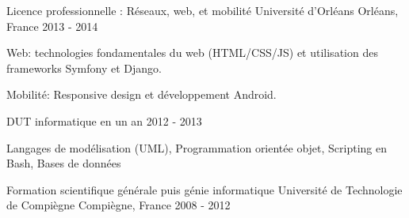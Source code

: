 \begin{cventries}
  \cventry
    {Licence professionnelle : Réseaux, web, et mobilité}
    {Université d'Orléans}
    {Orléans, France}
    {2013 - 2014}
    {
      \begin{cvitems}
        \item {Web: technologies fondamentales du web (HTML/CSS/JS) et utilisation des frameworks Symfony et Django.}
        \item {Mobilité: Responsive design et développement Android.}
      \end{cvitems}
      \vspace{-2.0mm}
    }
  \cventry
    {DUT informatique en un an}
    {}
    {}
    {2012 - 2013}
    {
      \begin{cvitems}
        \item {Langages de modélisation (UML), Programmation orientée objet, Scripting en Bash, Bases de données}
      \end{cvitems}
    }
  \cventry
    {Formation scientifique générale puis génie informatique}
    {Université de Technologie de Compiègne}
    {Compiègne, France}
    {2008 - 2012}
    {}
\end{cventries}

